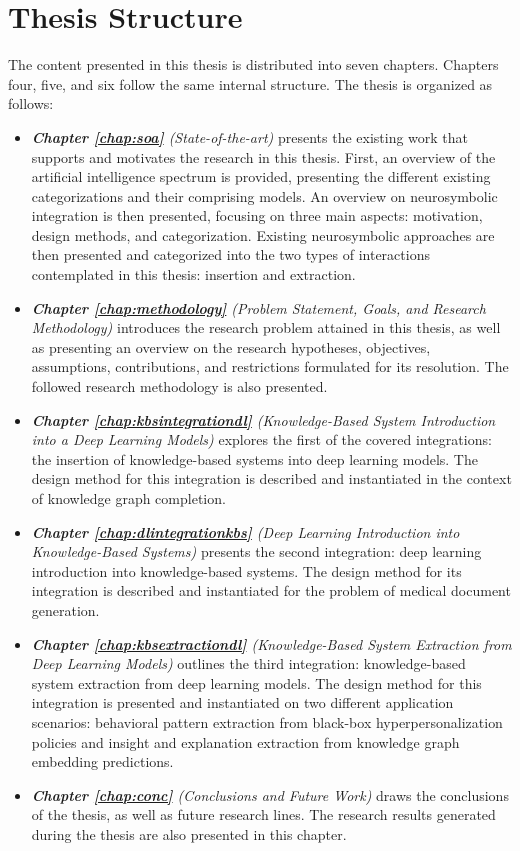 \section{Thesis Structure}
The content presented in this thesis is distributed into seven chapters. Chapters four, five, and six follow the same internal structure. The thesis is organized as follows:
\begin{itemize}
    \item \textit{\textbf{Chapter \ref{chap:soa}} (State-of-the-art)} presents the existing work that supports and motivates the research in this thesis. First, an overview of the artificial intelligence spectrum is provided, presenting the different existing categorizations and their comprising models. An overview on neurosymbolic integration is then presented, focusing on three main aspects: motivation, design methods, and categorization. Existing neurosymbolic approaches are then presented and categorized into the two types of interactions contemplated in this thesis: insertion and extraction.
    
    \item \textit{\textbf{Chapter \ref{chap:methodology}} (Problem Statement, Goals, and Research Methodology)} introduces the research problem attained in this thesis, as well as presenting an overview on the research hypotheses, objectives, assumptions, contributions, and restrictions formulated for its resolution. The followed research methodology is also presented.
    
    \item \textit{\textbf{Chapter \ref{chap:kbsintegrationdl}} (Knowledge-Based System Introduction into a Deep Learning Models)} explores the first of the covered integrations: the insertion of knowledge-based systems into deep learning models. The design method for this integration is described and instantiated in the context of knowledge graph completion.
    
    \item \textit{\textbf{Chapter \ref{chap:dlintegrationkbs}} (Deep Learning Introduction into Knowledge-Based Systems)} presents the second integration: deep learning introduction into knowledge-based systems. The design method for its integration is described and instantiated for the problem of medical document generation.
    
    \item \textit{\textbf{Chapter \ref{chap:kbsextractiondl}} (Knowledge-Based System Extraction from Deep Learning Models)} outlines the third integration: knowledge-based system extraction from deep learning models. The design method for this integration is presented and instantiated on two different application scenarios: behavioral pattern extraction from black-box hyperpersonalization policies and insight and explanation extraction from knowledge graph embedding predictions.
    
    \item \textit{\textbf{Chapter \ref{chap:conc}} (Conclusions and Future Work)} draws the conclusions of the thesis, as well as future research lines. The research results generated during the thesis are also presented in this chapter.
\end{itemize}
